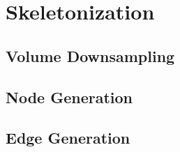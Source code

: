 \section{Skeletonization}

\subsection{Volume Downsampling}

\subsection{Node Generation}

\subsection{Edge Generation}